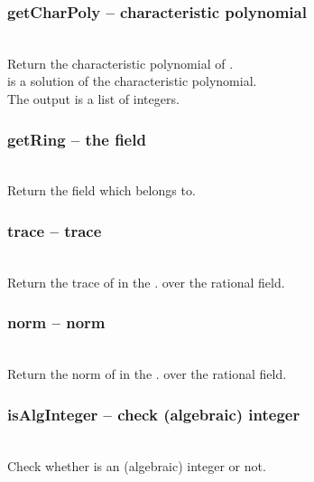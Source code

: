   \subsubsection{getCharPoly -- characteristic polynomial}
  \\
  \spacing
  \quad Return the characteristic polynomial of . \\
  \spacing
  \quad \negok {} is a solution of the characteristic polynomial.\\
  \spacing
  \quad The output is a list of integers. \\
%
  \subsubsection{getRing -- the field}
  \\
  \spacing
  \quad Return the field which  belongs to. \\
%
  \subsubsection{trace -- trace}
  \\
  \spacing
  \quad Return the trace of  in the . over the rational field. \\
%
  \subsubsection{norm -- norm}
  \\
  \spacing
  \quad Return the norm of  in the . over the rational field. \\
%
  \subsubsection{isAlgInteger -- check (algebraic) integer}
  \\
  \spacing
  \quad Check whether  is an (algebraic) integer or not. \\
%
